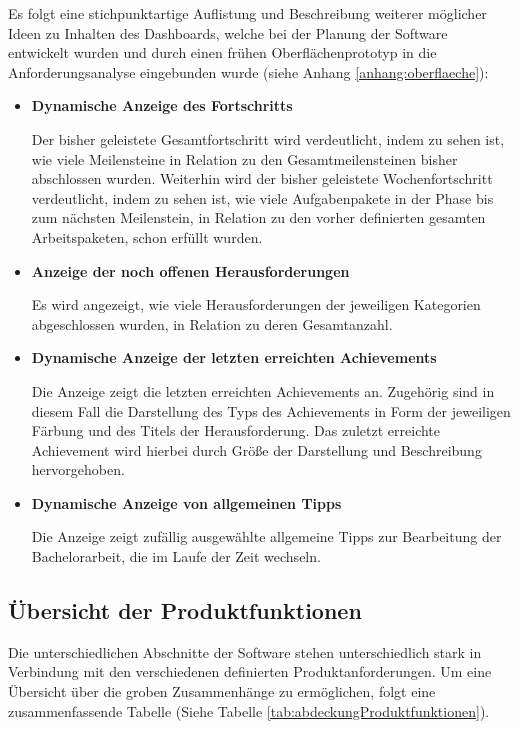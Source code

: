 \documentclass[bibliography=totoc,listof=totoc,BCOR=5mm,DIV=12,oneside]{scrbook}
\begin{document}
\newpage
\par \bigskip Es folgt eine stichpunktartige Auflistung und Beschreibung weiterer möglicher Ideen zu Inhalten des Dashboards, welche bei der Planung der Software entwickelt wurden und durch einen frühen Oberflächenprototyp in die Anforderungsanalyse eingebunden wurde (siehe Anhang \ref{anhang:oberflaeche}):
\begin{itemize}
\item \textbf{Dynamische Anzeige des Fortschritts}
\par Der bisher geleistete Gesamtfortschritt wird verdeutlicht, indem zu sehen ist, wie viele Meilensteine in Relation zu den Gesamtmeilensteinen bisher abschlossen wurden. Weiterhin wird der bisher geleistete Wochenfortschritt verdeutlicht, indem zu sehen ist, wie viele Aufgabenpakete in der Phase bis zum nächsten Meilenstein, in Relation zu den vorher definierten gesamten Arbeitspaketen, schon erfüllt wurden.
\item \textbf{Anzeige der noch offenen Herausforderungen}
\par Es wird angezeigt, wie viele Herausforderungen der jeweiligen Kategorien abgeschlossen wurden, in Relation zu deren Gesamtanzahl.
\item \textbf{Dynamische Anzeige der letzten erreichten Achievements}
\par Die Anzeige zeigt die letzten erreichten Achievements an. Zugehörig sind in diesem Fall die Darstellung des Typs des Achievements in Form der jeweiligen Färbung und des Titels der Herausforderung. Das zuletzt erreichte Achievement wird hierbei durch Größe der Darstellung und Beschreibung hervorgehoben.
\item \textbf{Dynamische Anzeige von allgemeinen Tipps}
\par Die Anzeige zeigt zufällig ausgewählte allgemeine Tipps zur Bearbeitung der Bachelorarbeit, die im Laufe der Zeit wechseln. 
\end{itemize}

\newpage
\subsection{Übersicht der Produktfunktionen}
\par Die unterschiedlichen Abschnitte der Software stehen unterschiedlich stark in Verbindung mit den verschiedenen definierten Produktanforderungen. Um eine Übersicht über die groben Zusammenhänge zu ermöglichen, folgt eine zusammenfassende Tabelle (Siehe Tabelle \ref{tab:abdeckungProduktfunktionen}).
\bigskip
\end{document}
